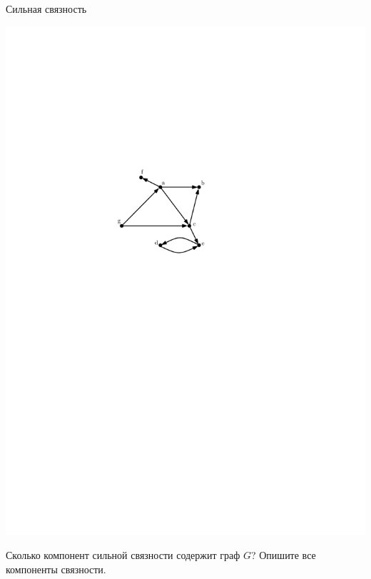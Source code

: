 \begin{frame}{Сильная связность}

\begin{center}
\includegraphics[scale=1]{img/digraph.pdf}
\end{center}

\exmpl Сколько компонент сильной связности содержит граф $G$?
Опишите все компоненты связности. 

\end{frame}


